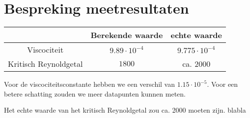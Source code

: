 \section{Bespreking meetresultaten}

\begin{center}
    \label{tab:vergelijking}
    \begin{tabular}{| c | c | c |}
        \hline
                                & Berekende waarde      & echte waarde          \\ \hline
        Viscociteit             & $9.89 \cdot 10^{-4}$  & $9.775 \cdot 10^{-4}$ \\ \hline
        Kritisch Reynoldgetal   & $1800$                & ca. $2000$            \\ \hline
    \end{tabular}
\end{center}
Voor de viscociteitsconstante hebben we een verschil van $1.15 \cdot 10^{-5}$.
Voor een betere schatting zouden we meer datapunten kunnen meten.

Het echte waarde van het kritisch Reynoldgetal zou ca. 2000 moeten zijn. blabla